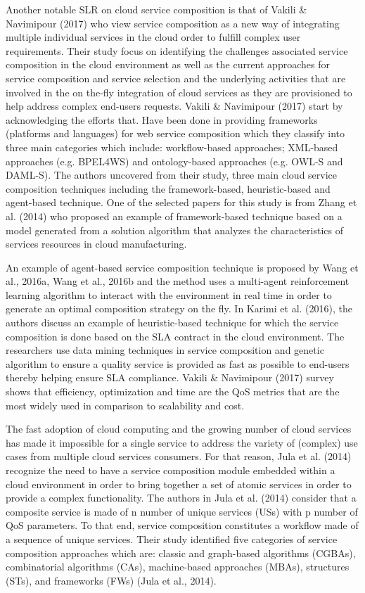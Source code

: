 \documentclass{article}
\begin{document}
Another notable SLR on cloud service composition is that of Vakili \& Navimipour (2017) who view service composition as a new way of integrating multiple individual services in the cloud order to fulfill complex user requirements. Their study focus on identifying the challenges associated service composition in the cloud environment as well as the current approaches for service composition and service selection and the underlying activities that are involved in the on the-fly integration of cloud services as they are provisioned to help address complex end-users requests. Vakili \& Navimipour (2017) start by acknowledging the efforts that. Have been done in providing frameworks (platforms and languages) for web service composition which they classify into three main categories which include: workflow-based approaches; XML-based approaches (e.g. BPEL4WS) and ontology-based approaches (e.g. OWL-S and DAML-S). The authors uncovered from their study, three main cloud service composition techniques including the framework-based, heuristic-based and agent-based technique. One of the selected papers for this study is from Zhang et al. (2014) who proposed an example of framework-based technique based on a model generated from a solution algorithm that analyzes the characteristics of services resources in cloud manufacturing.

An example of agent-based service composition technique is proposed by Wang et al., 2016a, Wang et al., 2016b and the method uses a multi-agent reinforcement learning algorithm to interact with the environment in real time in order to generate an optimal composition strategy on the fly.
In Karimi et al. (2016), the authors discuss an example of heuristic-based technique for which the service composition is done based on the SLA contract in the cloud environment. The researchers use data mining techniques in service composition and genetic algorithm to ensure a quality service is provided as fast as possible to end-users thereby helping ensure SLA compliance. Vakili \& Navimipour (2017) survey shows that efficiency, optimization and time are the QoS metrics that are the most widely used in comparison to scalability and cost.

The fast adoption of cloud computing and the growing number of cloud services has made it impossible for a single service to address the variety of (complex) use cases from multiple cloud services consumers. For that reason, Jula et al. (2014) recognize the need to have a service composition module embedded within a cloud environment in order to bring together a set of atomic services in order to provide a complex functionality. The authors in Jula et al. (2014) consider that a composite service is made of n number of unique services (USs) with p number of QoS parameters. To that end, service composition constitutes a workflow made of a sequence of unique services. Their study identified five categories of service composition approaches which are: classic and graph-based algorithms (CGBAs), combinatorial algorithms (CAs), machine-based approaches (MBAs), structures (STs), and frameworks (FWs) (Jula et al., 2014).
\end{document}
